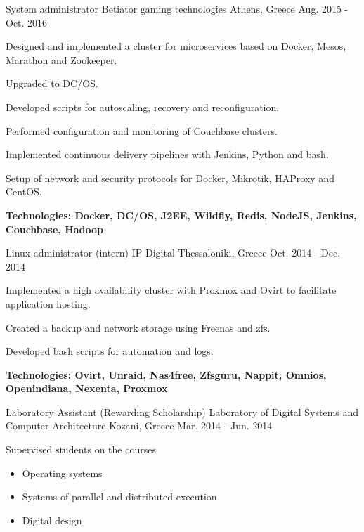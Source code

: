 \begin{cventries}

\cventry
{System administrator} %
{Betiator gaming technologies} %
{Athens, Greece} %
{Aug. 2015 - Oct. 2016} %
{ %
\begin{cvitems}
\item {Designed and implemented a cluster for microservices based on Docker, Mesos, Marathon and Zookeeper.}
\item {Upgraded to DC/OS.}
\item {Developed scripts for autoscaling, recovery and reconfiguration.}
\item {Performed configuration and monitoring of Couchbase clusters.}
\item {Implemented continuous delivery pipelines with Jenkins, Python and bash.}
\item {Setup of network and security protocols for Docker, Mikrotik, HAProxy and CentOS.}
\item {\bfseries{Technologies:} Docker, DC/OS, J2EE, Wildfly, Redis, NodeJS, Jenkins, Couchbase, Hadoop}
\end{cvitems}
}


\cventry
{Linux administrator (intern)} %
{IP Digital} %
{Thessaloniki, Greece} %
{Oct. 2014 - Dec. 2014} %
{ %
\begin{cvitems}
\item {Implemented a high availability cluster with Proxmox and Ovirt to facilitate application hosting.}
\item {Created a backup and network storage using Freenas and zfs.}
\item {Developed bash scripts for automation and logs.}
\item {\bfseries{Technologies:} Ovirt, Unraid, Nas4free, Zfsguru, Nappit, Omnios, Openindiana, Nexenta, Proxmox}
\end{cvitems}
}


\cventry
{Laboratory Assistant (Rewarding Scholarship)} %
{Laboratory of Digital Systems and Computer Architecture} %
{Kozani, Greece} %
{Mar. 2014 - Jun. 2014} %
{ %
\begin{cvitems}
\item {Supervised students on the courses}
\begin{itemize}
\item {Operating systems}
\item {Systems of parallel and distributed execution}
\item {Digital design}
\end{itemize}
\end{cvitems}
}


\end{cventries}
